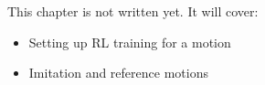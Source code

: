 \label{ch:k14}
\begin{keyidea}
This chapter is not written yet. It will cover:
\begin{itemize}[nosep]
  \item Setting up RL training for a motion
  \item Imitation and reference motions
\end{itemize}
\end{keyidea}
